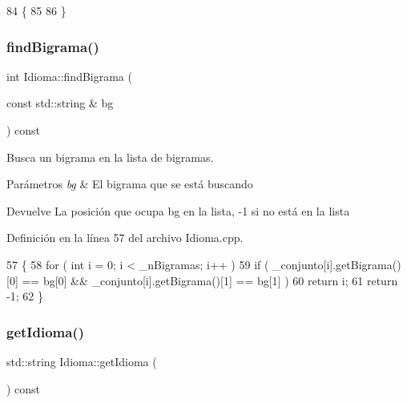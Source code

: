 \begin{DoxyCode}
84                                                  \{
85     
86 \}
\end{DoxyCode}
\mbox{\label{classIdioma_a111e1cdd3070e81782b6890e14391804}} 
\subsubsection{\texorpdfstring{find\+Bigrama()}{findBigrama()}}
{\footnotesize\ttfamily int Idioma\+::find\+Bigrama (\begin{DoxyParamCaption}\item[{const std\+::string \&}]{bg }\end{DoxyParamCaption}) const}



Busca un bigrama en la lista de bigramas. 


\begin{DoxyParams}{Parámetros}
{\em bg} & El bigrama que se está buscando \\
\hline
\end{DoxyParams}
\begin{DoxyReturn}{Devuelve}
La posición que ocupa {\ttfamily bg} en la lista, -\/1 si no está en la lista 
\end{DoxyReturn}


Definición en la línea 57 del archivo Idioma.\+cpp.


\begin{DoxyCode}
57                                               \{
58     \textcolor{keywordflow}{for} ( \textcolor{keywordtype}{int} i = 0; i < \_nBigramas; i++ )
59         \textcolor{keywordflow}{if} ( \_conjunto[i].getBigrama()[0] == bg[0] && \_conjunto[i].getBigrama()[1] == bg[1] )
60             \textcolor{keywordflow}{return} i;
61     \textcolor{keywordflow}{return} -1;
62 \}
\end{DoxyCode}
\mbox{\label{classIdioma_a7e00ccf37184dbe4247df7c093b4456d}} 
\subsubsection{\texorpdfstring{get\+Idioma()}{getIdioma()}}
{\footnotesize\ttfamily std\+::string Idioma\+::get\+Idioma (\begin{DoxyParamCaption}{ }\end{DoxyParamCaption}) const}




